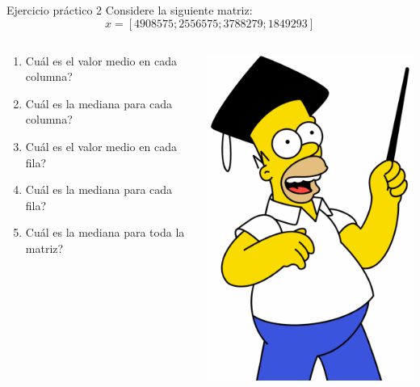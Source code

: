 \documentclass{bredelebeamer}
\begin{document}
\begin{frame}{Ejercicio práctico 2}
Considere la siguiente matriz:
\begin{equation*}
x = [4 90 85 75 ; 2 55 65 75 ; 3 78 82 79 ; 1 84 92 93]
\end{equation*}
\begin{columns}
\begin{column}{0.6\textwidth}
\begin{center}
\begin{enumerate}
\item Cuál es el valor medio en cada columna?
\item Cuál es la mediana para cada columna?
\item Cuál es el valor medio en cada fila?
\item Cuál es la mediana para cada fila?
\item Cuál es la mediana para toda la matriz?
\end{enumerate}
\end{center}
\end{column}
\begin{column}{0.4\textwidth}
\begin{center}
\includegraphics[scale=0.2]{images/img42.png}
\end{center}
\end{column}
\end{columns}
\end{frame}
\end{document}
